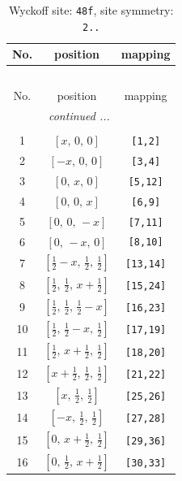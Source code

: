 \documentclass[fleqn,8pt]{jsarticle}
\begin{document}
\begin{longtable}{ccc}
\caption{Wyckoff site: {\tt 48f}, site symmetry: {\tt 2..}}
 \\
 \hline \hline
No. & position & mapping \\ \hline \endfirsthead

\multicolumn{2}{l}{\tablename\ \thetable{}} \\
 \hline \hline
No. & position & mapping \\ \hline \endhead

 \hline \hline
\multicolumn{2}{r}{\footnotesize\it continued ...} \\ \endfoot

 \hline \hline
\multicolumn{2}{r}{} \\ \endlastfoot

1 & $\left[ x,\, 0,\, 0 \right]$ & {\tt [1,2]} \\ \hline
2 & $\left[ - x,\, 0,\, 0 \right]$ & {\tt [3,4]} \\ \hline
3 & $\left[ 0,\, x,\, 0 \right]$ & {\tt [5,12]} \\ \hline
4 & $\left[ 0,\, 0,\, x \right]$ & {\tt [6,9]} \\ \hline
5 & $\left[ 0,\, 0,\, - x \right]$ & {\tt [7,11]} \\ \hline
6 & $\left[ 0,\, - x,\, 0 \right]$ & {\tt [8,10]} \\ \hline
7 & $\left[ \frac{1}{2} - x,\, \frac{1}{2},\, \frac{1}{2} \right]$ & {\tt [13,14]} \\ \hline
8 & $\left[ \frac{1}{2},\, \frac{1}{2},\, x + \frac{1}{2} \right]$ & {\tt [15,24]} \\ \hline
9 & $\left[ \frac{1}{2},\, \frac{1}{2},\, \frac{1}{2} - x \right]$ & {\tt [16,23]} \\ \hline
10 & $\left[ \frac{1}{2},\, \frac{1}{2} - x,\, \frac{1}{2} \right]$ & {\tt [17,19]} \\ \hline
11 & $\left[ \frac{1}{2},\, x + \frac{1}{2},\, \frac{1}{2} \right]$ & {\tt [18,20]} \\ \hline
12 & $\left[ x + \frac{1}{2},\, \frac{1}{2},\, \frac{1}{2} \right]$ & {\tt [21,22]} \\ \hline
13 & $\left[ x,\, \frac{1}{2},\, \frac{1}{2} \right]$ & {\tt [25,26]} \\ \hline
14 & $\left[ - x,\, \frac{1}{2},\, \frac{1}{2} \right]$ & {\tt [27,28]} \\ \hline
15 & $\left[ 0,\, x + \frac{1}{2},\, \frac{1}{2} \right]$ & {\tt [29,36]} \\ \hline
16 & $\left[ 0,\, \frac{1}{2},\, x + \frac{1}{2} \right]$ & {\tt [30,33]} \\ \hline

\end{longtable}
\end{document}

